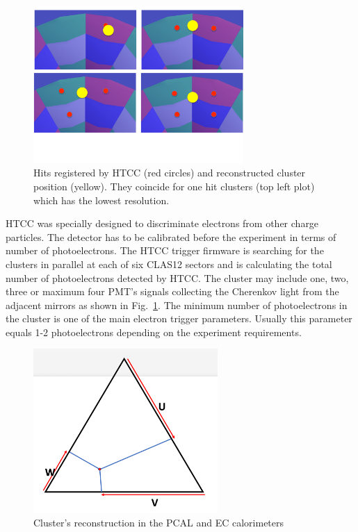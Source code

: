 \begin{figure}[htp]
\begin{center}
\centering

\includegraphics[width=8cm]{img/multiHits.pdf}

\caption{Hits registered by HTCC (red circles) and reconstructed cluster position (yellow). They coincide for one hit clusters (top left plot) which has the lowest resolution.}
\label{fig:multihitHTCC}
\end{center}
\end{figure} 

HTCC  was specially designed to discriminate electrons from other charge particles. 
The detector has to be calibrated before the experiment in terms of number of photoelectrons. The HTCC trigger firmware
is searching for the clusters in parallel at each of six CLAS12 sectors and is calculating the total number of photoelectrons  detected by HTCC. The cluster may include one, two, three or maximum four PMT's signals collecting the Cherenkov light from the adjacent mirrors as shown in  Fig.~\ref{fig:multihitHTCC}. The minimum number of  photoelectrons in the cluster  is one of the main electron trigger parameters. Usually this parameter equals 1-2 photoelectrons depending on the experiment requirements.
\begin{figure}[htp]
\begin{center}
\centering
\includegraphics[width=7cm]{img/PCAL-EC.pdf}

\caption{Cluster's reconstruction in the PCAL and EC calorimeters}
\label{fig:PCAL}
\end{center}
\end{figure} 

